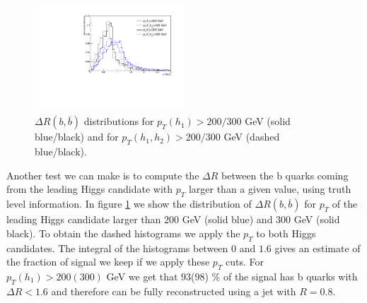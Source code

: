 \begin{figure}
	\centering
	\includegraphics[width=0.5\textwidth]{./Figures/deltaR.pdf}
	\caption{\label{fig:deltaRbb} $\Delta R(b,\overline{b})$ distributions for $p_T(h_1)>200/300$ GeV (solid blue/black) and for $p_T(h_1,h_2)>200/300$ GeV (dashed blue/black).}
\end{figure}

Another test we can make is to compute the $\Delta R$ between the b quarks coming from the leading Higgs candidate with $p_T$ larger than a given value, using truth level information. In figure \ref{fig:deltaRbb} we show the distribution of $\Delta R(b,\overline{b})$ for $p_T$ of the leading Higgs candidate larger than $200$ GeV (solid blue) and $300$ GeV (solid black). To obtain the dashed histograms we apply the $p_T$ to both Higgs candidates. The integral of the histograms between $0$ and $1.6$ gives an estimate of the fraction of signal we keep if we apply these $p_T$ cuts. For $p_T(h_1)>200(300)$ GeV we get that $93$($98$) \% of the signal has b quarks with $\Delta R <1.6$ and therefore can be fully reconstructed using a jet with $R=0.8$.



